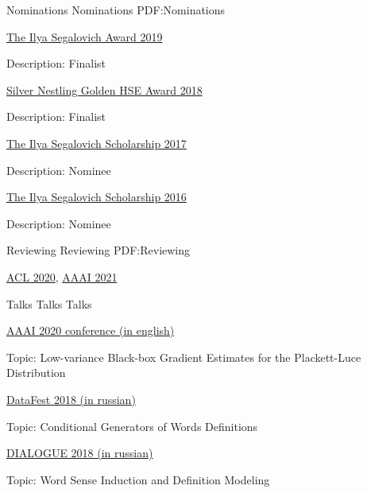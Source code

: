 \documentclass[letterpaper,MMMyyyy,nonstopmode]{simpleresumecv}
\begin{document}
\begin{Body}

\Section
{Nominations}
{Nominations}
{PDF:Nominations}

\BulletItem
\href{https://cs.hse.ru/en/stipend/}{The Ilya Segalovich Award 2019}
\begin{Detail}
\Item
Description: Finalist
\end{Detail}

\BulletItem
\href{https://www.hse.ru/gold/cm/silver/2018/gadetsky}{Silver Nestling Golden HSE Award 2018}
\begin{Detail}
\Item
Description: Finalist
\end{Detail}

\BulletItem
\href{https://yandex.com/scholarships/students}{The Ilya Segalovich Scholarship 2017}
\begin{Detail}
\Item
Description: Nominee
\end{Detail}

\BulletItem
\href{https://yandex.com/scholarships/students}{The Ilya Segalovich Scholarship 2016}
\begin{Detail}
\Item
Description: Nominee
\end{Detail}


\Section
{Reviewing}
{Reviewing}
{PDF:Reviewing}

\BulletItem
\href{https://acl2020.org}{ACL 2020}, \href{https://aaai.org/Conferences/AAAI-21/}{AAAI 2021}


\Section
{Talks}
{Talks}
{Talks}

\Item
\href{https://aaai.org/Conferences/AAAI-20/}{AAAI 2020 conference (in english)}
\begin{Detail}
\Item
Topic: Low-variance Black-box Gradient Estimates for the Plackett-Luce Distribution
\end{Detail}

\Item
\href{http://datafest.ru}{DataFest 2018 (in russian)}
\begin{Detail}
\Item
Topic: Conditional Generators of Words Definitions
\end{Detail}

\Gap
\Item
\href{http://www.dialog-21.ru/en/}{DIALOGUE 2018 (in russian)}
\begin{Detail}
\Item
Topic: Word Sense Induction and Definition Modeling
\end{Detail}



\end{Body}
\end{document}

